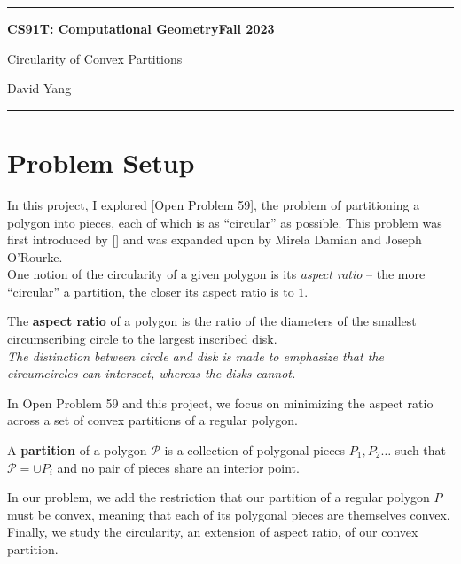 \documentclass[11pt]{article}
\begin{document}
\hrule
\begin{center}
    \textbf{CS91T: Computational Geometry}\hfill \textbf{Fall 2023}\newline

    {\Large Circularity of Convex Partitions}

    David Yang
\end{center}

\hrule

\vspace{1em}

\section{Problem Setup}
In this project, I explored [Open Problem 59], the problem of partitioning a polygon into pieces, each of which is as
``circular'' as possible. This problem was first introduced by [] and was expanded upon by Mirela Damian and Joseph O'Rourke. \\


One notion of the circularity of a given polygon is its \textit{aspect ratio} -- the more ``circular'' a partition, the closer its aspect ratio is to $1$.

\begin{definition}
The \textbf{aspect ratio} of a polygon is the ratio of the diameters of the smallest circumscribing circle to the largest inscribed disk. \\

\textit{The distinction between circle and disk is made to emphasize that the circumcircles can intersect, whereas the disks cannot.}
\end{definition}

In Open Problem 59 and this project, we focus on minimizing the aspect ratio across a set of convex partitions of a regular polygon.

\begin{definition}[Partition]
A \textbf{partition} of a polygon $\mathcal{P}$ is a collection of polygonal pieces $P_1, P_2 \dots $ such that $\mathcal{P} = \cup P_i$ and no pair of pieces share an interior point. 
\end{definition}

In our problem, we add the restriction that our partition of a regular polygon $P$ must be convex, meaning that each of its polygonal pieces are themselves convex. Finally, we study the 
circularity, an extension of aspect ratio, of our convex partition.
\end{document}
